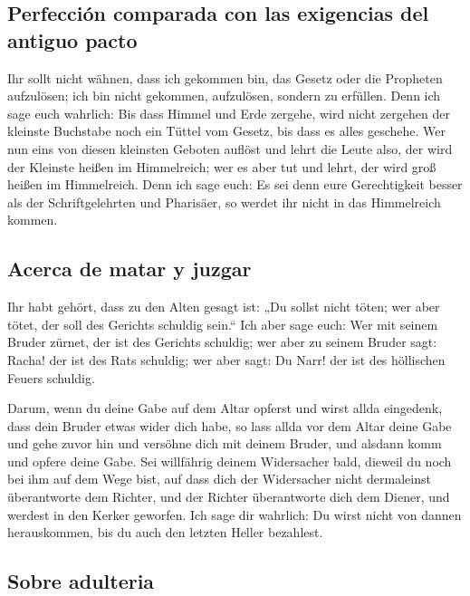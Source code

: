 \hypertarget{perfecciuxf3n-comparada-con-las-exigencias-del-antiguo-pacto}{%
\subsection{Perfección comparada con las exigencias del antiguo
pacto}\label{perfecciuxf3n-comparada-con-las-exigencias-del-antiguo-pacto}}

 Ihr sollt nicht wähnen, dass ich gekommen bin, das
Gesetz oder die Propheten aufzulösen; ich bin nicht gekommen,
aufzulösen, sondern zu erfüllen.  Denn ich sage euch
wahrlich: Bis dass Himmel und Erde zergehe, wird nicht zergehen der
kleinste Buchstabe noch ein Tüttel vom Gesetz, bis dass es alles
geschehe.  Wer nun eins von diesen kleinsten Geboten
auflöst und lehrt die Leute also, der wird der Kleinste heißen im
Himmelreich; wer es aber tut und lehrt, der wird groß heißen im
Himmelreich.  Denn ich sage euch: Es sei denn eure
Gerechtigkeit besser als der Schriftgelehrten und Pharisäer, so werdet
ihr nicht in das Himmelreich kommen.

\hypertarget{acerca-de-matar-y-juzgar}{%
\subsection{Acerca de matar y juzgar}\label{acerca-de-matar-y-juzgar}}

 Ihr habt gehört, dass zu den Alten gesagt ist: „Du
sollst nicht töten; wer aber tötet, der soll des Gerichts schuldig
sein.``  Ich aber sage euch: Wer mit seinem Bruder
zürnet, der ist des Gerichts schuldig; wer aber zu seinem Bruder sagt:
Racha! der ist des Rats schuldig; wer aber sagt: Du Narr! der ist des
höllischen Feuers schuldig.

 Darum, wenn du deine Gabe auf dem Altar opferst und
wirst allda eingedenk, dass dein Bruder etwas wider dich habe,
 so lass allda vor dem Altar deine Gabe und gehe zuvor
hin und versöhne dich mit deinem Bruder, und alsdann komm und opfere
deine Gabe.  Sei willfährig deinem Widersacher bald,
dieweil du noch bei ihm auf dem Wege bist, auf dass dich der Widersacher
nicht dermaleinst überantworte dem Richter, und der Richter überantworte
dich dem Diener, und werdest in den Kerker geworfen.  Ich
sage dir wahrlich: Du wirst nicht von dannen herauskommen, bis du auch
den letzten Heller bezahlest.

\hypertarget{sobre-adulteria}{%
\subsection{Sobre adulteria}\label{sobre-adulteria}}


